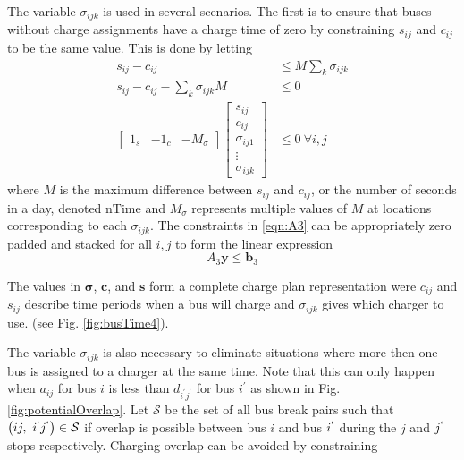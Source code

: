 	The variable $\sigma_{ijk}$ is used in several scenarios. The first is to ensure that buses without charge assignments have a charge time of zero by constraining $s_{ij}$ and $c_{ij}$ to be the same value. This is done by letting
	\begin{equation}\label{eqn:A3}\begin{aligned}
	s_{ij} - c_{ij} &\le M\sum_{k}\sigma_{ijk} \\
	s_{ij} - c_{ij} - \sum_{k}\sigma_{ijk}M &\le 0\\
	\begin{bmatrix} 1_s & -1_c & -M_{\sigma} \end{bmatrix}\begin{bmatrix}s_{ij} \\ c_{ij} \\ \sigma_{ij1} \\ \vdots \\ \sigma_{ijk} \end{bmatrix} &\le 0 \ \forall i,j 
\end{aligned} \end{equation}
	where $M$ is the maximum difference between $s_{ij}$ and $c_{ij}$, or the number of seconds in a day, denoted $\text{nTime}$ and $M_\sigma$ represents multiple values of $M$ at locations corresponding to each $\sigma_{ijk}$. The constraints in \eqref{eqn:A3} can be appropriately zero padded and stacked for all $i,j$ to form the linear expression
	\begin{equation} 
		A_3\mathbf{y} \le \mathbf{b}_3
	\end{equation}
	\par The values in $\boldsymbol{\sigma}$, $\mathbf{c}$, and $\mathbf{s}$ form a complete charge plan representation were $c_{ij}$ and $s_{ij}$ describe time periods when a bus will charge and $\sigma_{ijk}$ gives which charger to use. (see Fig. \ref{fig:busTime4}).

	The variable $\sigma_{ijk}$ is also necessary to eliminate situations where more then one bus is assigned to a charger at the same time. Note that this can only happen when $a_{ij}$ for bus $i$ is less than $d_{i^{'}j^{'}}$ for bus $i^{'}$ as shown in Fig. \ref{fig:potentialOverlap}. Let $\mathcal{S}$ be the set of all bus break pairs such that $\left (ij, \ i^{`}j^{`} \right ) \in \mathcal{S}$ if overlap is possible between bus $i$ and bus $i^{`}$ during the $j$ and $j^{`}$ stops respectively. Charging overlap can be avoided by constraining


